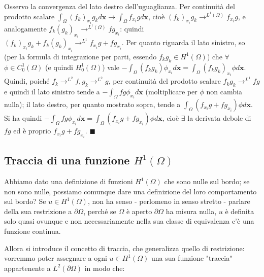 \documentclass{article}
\begin{document}
Osservo la convergenza del lato destro dell'uguaglianza. Per continuit\`{a}
del prodotto scalare $\int_{\Omega }\left( f_{k}\right) _{x_{i}}g_{k}d%
\mathbf{x}\rightarrow \int_{\Omega }f_{x_{i}}gd\mathbf{x}$, cio\`{e} $\left(
f_{k}\right) _{x_{i}}g_{k}\rightarrow ^{L^{1}\left( \Omega \right)
}f_{x_{i}}g$, e analogamente $f_{k}\left( g_{k}\right) _{x_{i}}\rightarrow
^{L^{1}\left( \Omega \right) }fg_{x_{i}}$: quindi $\left( f_{k}\right)
_{x_{i}}g_{k}+f_{k}\left( g_{k}\right) _{x_{i}}\rightarrow
^{L^{1}}f_{x_{i}}g+fg_{x_{i}}$. Per quanto riguarda il lato sinistro, so
(per la formula di integrazione per parti, essendo $f_{k}g_{k}\in
H^{1}\left( \Omega \right) $) che $\forall $ $\phi \in C_{0}^{1}\left(
\Omega \right) $ (e quindi $H_{0}^{1}\left( \Omega \right) $) vale $%
-\int_{\Omega }\left( f_{k}g_{k}\right) \phi _{x_{i}}d\mathbf{x}%
=\int_{\Omega }\left( f_{k}g_{k}\right) _{x_{i}}\phi d\mathbf{x}$. Quindi,
poich\'{e} $f_{k}\rightarrow ^{L^{2}}f,g_{k}\rightarrow ^{L^{2}}g$, per
continuit\`{a} del prodotto scalare $f_{k}g_{k}\rightarrow ^{L^{1}}fg$ e
quindi il lato sinistro tende a $-\int_{\Omega }fg\phi _{x_{i}}d\mathbf{x}$
(moltiplicare per $\phi $ non cambia nulla); il lato destro, per quanto
mostrato sopra, tende a $\int_{\Omega }\left( f_{x_{i}}g+fg_{x_{i}}\right)
\phi d\mathbf{x}$. Si ha quindi $-\int_{\Omega }fg\phi _{x_{i}}d\mathbf{x=}%
\int_{\Omega }\left( f_{x_{i}}g+fg_{x_{i}}\right) \phi d\mathbf{x}$, cio\`{e}
$\exists $ la derivata debole di $fg$ ed \`{e} proprio $%
f_{x_{i}}g+fg_{x_{i}} $. $\blacksquare $

\subsection{Traccia di una funzione $H^{1}\left( \Omega \right) $}

Abbiamo dato una definizione di funzioni $H^{1}\left( \Omega \right) $ che
sono nulle sul bordo; se non sono nulle, possiamo comunque dare una
definizione del loro comportamento sul bordo? Se $u\in H^{1}\left( \Omega
\right) $, non ha senso - perlomeno in senso stretto - parlare della sua
restrizione a $\partial \Omega $, perch\'{e} se $\Omega $ \`{e} aperto $\partial \Omega $ ha misura nulla, $u$ \`{e}
definita solo quasi ovunque e non necessariamente nella sua classe di
equivalenza c'\`{e} una funzione continua.

Allora si introduce il concetto di traccia, che generalizza quello di
restrizione: vorremmo poter assegnare a ogni $u\in H^{1}\left( \Omega
\right) $ una sua funzione "traccia" appartenente a $L^{2}\left( \partial
\Omega \right) $ in modo che:
\end{document}
